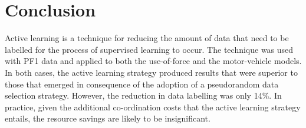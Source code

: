 \section{Conclusion} Active learning is a technique for reducing the amount of data that need to be labelled for the process of supervised learning to occur. The technique was used with PF1 data and applied to both the use-of-force and the motor-vehicle models. In both cases, the active learning strategy produced results that were superior to those that emerged in consequence of the adoption of a pseudorandom data selection strategy. However, the reduction in data labelling was only 14\%. In practice, given the additional co-ordination costs that the active learning strategy entails, the resource savings are likely to be insignificant. 
 
